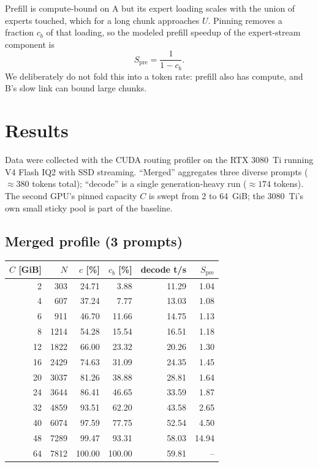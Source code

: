 \documentclass[11pt]{article}
\begin{document}
Prefill is compute-bound on A but its expert loading scales with the union of
experts touched, which for a long chunk approaches $U$. Pinning removes a
fraction $c_b$ of that loading, so the modeled prefill speedup of the
expert-stream component is
\[
S_{\text{pre}} = \frac{1}{1-c_b}.
\]
We deliberately do not fold this into a token rate: prefill also has compute,
and B's slow link can bound large chunks.

\section{Results}

Data were collected with the CUDA routing profiler on the RTX 3080~Ti running
V4 Flash IQ2 with SSD streaming. ``Merged'' aggregates three diverse prompts
($\approx 380$ tokens total); ``decode'' is a single generation-heavy run
($\approx 174$ tokens). The second GPU's pinned capacity $C$ is swept from 2
to 64~GiB; the 3080~Ti's own small sticky pool is part of the baseline.

\subsection*{Merged profile (3 prompts)}

\begin{center}
\begin{tabular}{rrrrrr}
\toprule
$C$ [GiB] & $N$ & $c$ [\%] & $c_b$ [\%] & decode t/s & $S_{\text{pre}}$ \\
\midrule
 2 &  303 & 24.71 &  3.88 & 11.29 & 1.04 \\
 4 &  607 & 37.24 &  7.77 & 13.03 & 1.08 \\
 6 &  911 & 46.70 & 11.66 & 14.75 & 1.13 \\
 8 & 1214 & 54.28 & 15.54 & 16.51 & 1.18 \\
12 & 1822 & 66.00 & 23.32 & 20.26 & 1.30 \\
16 & 2429 & 74.63 & 31.09 & 24.35 & 1.45 \\
20 & 3037 & 81.26 & 38.88 & 28.81 & 1.64 \\
24 & 3644 & 86.41 & 46.65 & 33.59 & 1.87 \\
32 & 4859 & 93.51 & 62.20 & 43.58 & 2.65 \\
40 & 6074 & 97.59 & 77.75 & 52.54 & 4.50 \\
48 & 7289 & 99.47 & 93.31 & 58.03 & 14.94 \\
64 & 7812 & 100.00 & 100.00 & 59.81 & -- \\
\bottomrule
\end{tabular}
\end{center}
\end{document}
